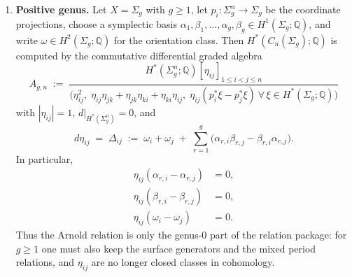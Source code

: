 \begin{proposition}
\begin{enumerate}
\item \textup{\textbf{Positive genus.}}
Let $X=\Sigma_g$ with $g\geq 1$, let
$p_i\colon \Sigma_g^n\to\Sigma_g$ be the coordinate projections, choose
a symplectic basis
$\alpha_1,\beta_1,\ldots,\alpha_g,\beta_g\in H^1(\Sigma_g;\mathbb{Q})$,
and write $\omega\in H^2(\Sigma_g;\mathbb{Q})$ for the orientation
class. Then $H^*(C_n(\Sigma_g);\mathbb{Q})$ is computed by the
commutative differential graded algebra
\[
A_{g,n}
\;:=\;
\frac{H^*(\Sigma_g^n;\mathbb{Q})[\eta_{ij}]_{1\leq i<j\leq n}}
{\bigl(
\eta_{ij}^2,\;
\eta_{ij}\eta_{jk}+\eta_{jk}\eta_{ki}+\eta_{ki}\eta_{ij},\;
\eta_{ij}(p_i^*\xi-p_j^*\xi)\ \forall\,\xi\in H^*(\Sigma_g;\mathbb{Q})
\bigr)}
\]
with $|\eta_{ij}|=1$, $d|_{H^*(\Sigma_g^n)}=0$, and
\begin{equation}
\label{eq:totaro-curve-differential}
d\eta_{ij}
\;=\;
\Delta_{ij}
\;:=\;
\omega_i+\omega_j
\;+\;
\sum_{r=1}^g
\bigl(\alpha_{r,i}\beta_{r,j}-\beta_{r,i}\alpha_{r,j}\bigr).
\end{equation}
In particular,
\begin{align}
\eta_{ij}(\alpha_{r,i}-\alpha_{r,j}) &= 0,\label{eq:totaro-curve-rel-1}\\
\eta_{ij}(\beta_{r,i}-\beta_{r,j}) &= 0,\label{eq:totaro-curve-rel-2}\\
\eta_{ij}(\omega_i-\omega_j) &= 0.\label{eq:totaro-curve-rel-3}
\end{align}
Thus the Arnold relation is only the genus-$0$ part of the relation
package: for $g\geq 1$ one must also keep the surface generators and the
mixed period relations, and $\eta_{ij}$ are no longer closed classes in
cohomology.
\end{enumerate}
\end{proposition}

